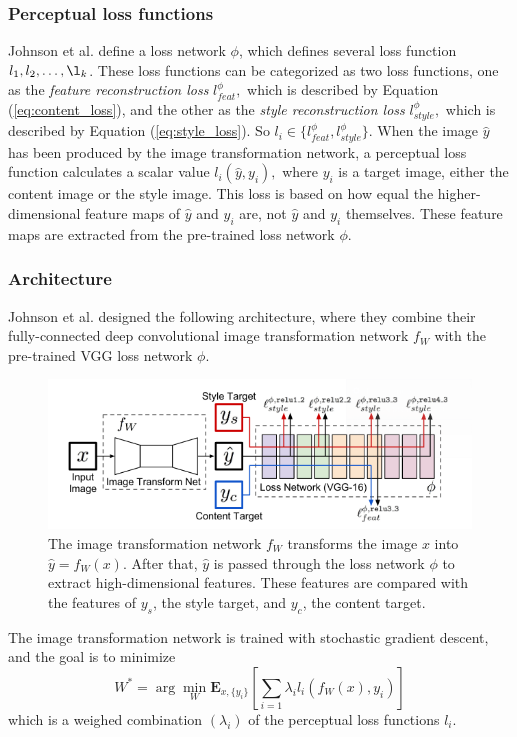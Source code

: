 \subsubsection{Perceptual loss functions}
\label{sec:loss}
Johnson et al. define a loss network $\phi$, which defines several loss function $l_1,l_2,\dots,\l_k$. These loss functions can be categorized as two loss functions, one as the \textit{feature reconstruction loss} $l_{feat}^\phi,$ which is described by Equation (\ref{eq:content_loss}), and the other as the \textit{style reconstruction loss} $l_{style}^\phi,$ which is described by Equation (\ref{eq:style_loss}). So $l_i\in\{l_{feat}^\phi,l_{style}^\phi\}.$ When the image $\hat{y}$ has been produced by the image transformation network, a perceptual loss function calculates a scalar value $l_i(\hat{y}, y_i),$ where $y_i$ is a target image, either the content image or the style image. This loss is based on how equal the higher-dimensional feature maps of $\hat{y}$ and $y_i$ are, not $\hat{y}$ and $y_i$ themselves. These feature maps are extracted from the pre-trained loss network $\phi.$
\subsubsection{Architecture}
Johnson et al. designed the following architecture, where they combine their fully-connected deep convolutional image transformation network $f_W$ with the pre-trained VGG loss network $\phi.$\newline
\begin{figure}[!ht]
\begin{center}
\includegraphics[scale=0.50]{report/Background/images/architecture.png}
\caption{The image transformation network $f_W$ transforms the image $x$ into $\hat{y}=f_W(x).$ After that, $\hat{y}$ is passed through the loss network $\phi$ to extract high-dimensional features. These features are compared with the features of $y_s$, the style target, and $y_c$, the content target.}
\label{fig:architecture}
\end{center}
\end{figure}\newline\newline
The image transformation network is trained with stochastic gradient descent, and the goal is to minimize
\begin{equation}
    W^*=\arg\min_W{\boldsymbol{E}_{x,\{y_i\}}\left[\sum_{i=1}{\lambda_il_i(f_W(x),y_i)}\right]}
\end{equation}
which is a weighed combination $(\lambda_i)$ of the perceptual loss functions $l_i$.
